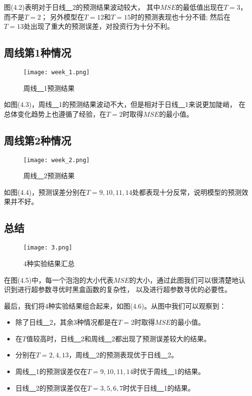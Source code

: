 图(4.2)表明对于日线\underline{~~}2的预测结果波动较大，
其中$MSE$的最低值出现在$T=3$，而不是$T=2$；
另外模型在$T=12$和$T=15$时的预测表现也十分不错;
然后在$T=13$处出现了重大的预测误差，对投资行为十分不利。

\subsection{周线第1种情况}

\begin{figure}[htb]
    \centering
    \caption{周线\underline{~~}1预测结果}
    \texttt{[image: week\_1.png]}
\end{figure}

如图(4.3)，周线\underline{~~}1的预测结果波动不大，但是相对于日线\underline{~~}1来说更加陡峭，
在总体变化趋势上也遵循了经验，在$T=2$时取得$MSE$的最小值。

\subsection{周线第2种情况}

\begin{figure}[hbt]
    \centering
    \caption{周线\underline{~~}2预测结果}
    \texttt{[image: week\_2.png]}
\end{figure}

如图(4.4)，预测误差分别在$T=9,10,11,14$处都表现十分反常，说明模型的预测效果并不好。

\subsection{总结}

\begin{figure}[ht]
    \centering
    \caption{4种实验结果汇总}
    \texttt{[image: 3.png]}
\end{figure}

在图(4.5)中，每一个泡泡的大小代表$MSE$的大小，通过此图我们可以很清楚地认识到进行超参数寻优时黑盒函数的复杂性，
以及进行超参数寻优的必要性。

最后，我们将4种实验结果组合起来，如图(4.6)。从图中我们可以观察到：
\begin{itemize}
    \item 除了日线\underline{~~}2，其余3种情况都是在$T=2$时取得$MSE$的最小值。
    \item 在$T$值较高时，日线\underline{~~}2和周线\underline{~~}2都出现了预测误差较大的结果。
    \item 分别在$T=2,4,13$，周线\underline{~~}2的预测表现优于日线\underline{~~}2。
    \item 周线\underline{~~}1的预测误差仅在$T=9,10,11,14$时优于周线\underline{~~}1的结果。
    \item 日线\underline{~~}2的预测误差仅在$T=3,5,6,7$时优于日线\underline{~~}1的结果。
\end{itemize}

